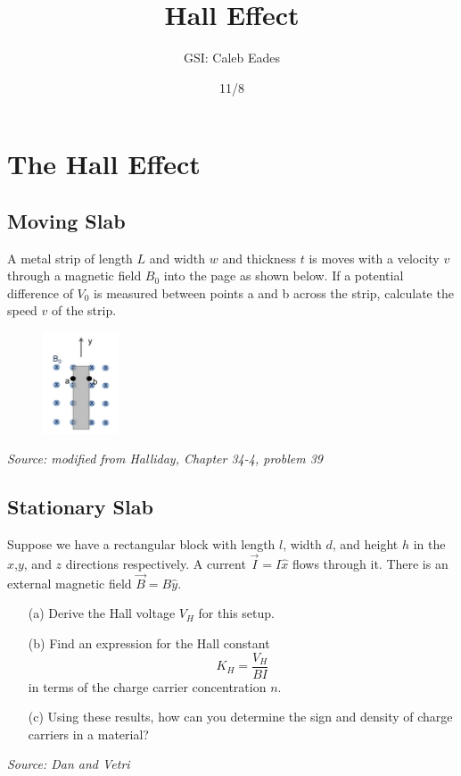 \documentclass{article}
\begin{document}
\title{Hall Effect}
\author{GSI: Caleb Eades}
\date{11/8}
\maketitle

\section{The Hall Effect}

\subsection{Moving Slab}

A metal strip of length $L$ and width $w$ and thickness $t$ is moves with a velocity $v$ through a magnetic field $B_0$ into the page as shown below. If a potential difference of $V_0$ is measured between points a and b across the strip, calculate the speed $v$ of the strip.

\begin{figure}[h]
	\begin{center}
	\includegraphics[width=0.2\textwidth]{Hall.png}
	\end{center}
\end{figure}

\textit{Source: modified from Halliday, Chapter 34-4, problem 39}

\subsection{Stationary Slab}

Suppose we have a rectangular block with length $l$, width $d$, and height $h$ in the $x$,$y$, and $z$ directions respectively. A current $\vec{I} = I \hat{x}$ flows through it. There is an external magnetic field $\vec{B} =  B \hat{y}$.
\begin{itemize}
	\item[(a)] Derive the Hall voltage $V_H$ for this setup.
	\item[(b)] Find an expression for the Hall constant 
	\[
	K_H = \frac{V_H}{B I}
	\]
	in terms of the charge carrier concentration $n$.
	\item[(c)] Using these results, how can you determine the sign and density of charge carriers in a material?
\end{itemize}

\textit{Source: Dan and Vetri}
\end{document}
